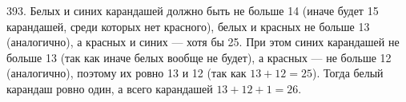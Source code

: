 393. Белых и синих карандашей должно быть не больше 14 (иначе будет 15 карандашей, среди которых нет красного), белых и красных не больше 13 (аналогично), а красных и синих --- хотя бы 25. При этом синих карандашей не больше 13 (так как иначе белых вообще не будет), а красных --- не больше 12 (аналогично), поэтому их ровно 13 и 12 (так как $13+12=25$). Тогда белый карандаш ровно один, а всего карандашей $13+12+1=26.$\\
